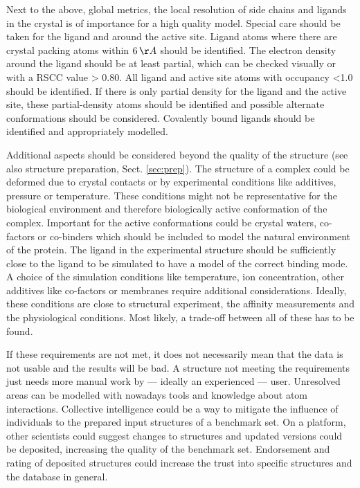 \documentclass[9pt,bestpractices]{livecoms}
\begin{document}
Next to the above, global metrics, the local resolution of side chains and ligands in the crystal is of importance for a high quality model. Special care should be taken for the ligand and around the active site. 
%
Ligand atoms where there are crystal packing atoms within $6\,\AA$ should be identified. The electron density around the ligand should be at least partial, which can be checked visually or with a RSCC value > 0.80.
%
All ligand and active site atoms with occupancy <1.0 should be identified.
%
If there is only partial density for the ligand and the active site, these partial-density atoms should be identified and possible alternate conformations should be considered. 
%
Covalently bound ligands should be identified and appropriately modelled.


Additional aspects should be considered beyond the quality of the structure (see also structure preparation, Sect. \ref{sec:prep}).
%
The structure of a complex could be deformed due to crystal contacts
or by experimental conditions like additives, pressure or temperature. These conditions might not be representative for the biological environment and therefore biologically active conformation of the complex.
%
Important for the active conformations could be crystal waters, co-factors or co-binders which should be included to model the natural environment of the protein.
%
The ligand in the experimental structure should be sufficiently close to the ligand to be simulated to have a model of the correct binding mode. 
%
A choice of the simulation conditions like temperature, ion concentration, other additives like co-factors or membranes require additional considerations. Ideally, these conditions are close to structural experiment, the affinity measurements and the physiological conditions. Most likely, a trade-off between all of these has to be found. 
    
%
If these requirements are not met, it does not necessarily mean that the data is not usable and the results will be bad. A structure not meeting the requirements just needs more manual work by --- ideally an experienced --- user. Unresolved areas can be modelled with nowadays tools and knowledge about atom interactions.
%
Collective intelligence could be a way to mitigate the influence of individuals to the prepared input structures of a benchmark set. On a platform, other scientists could suggest changes to structures and updated versions could be deposited, increasing the quality of the benchmark set. Endorsement and rating of deposited structures could increase the trust into specific structures and the database in general.
\end{document}
